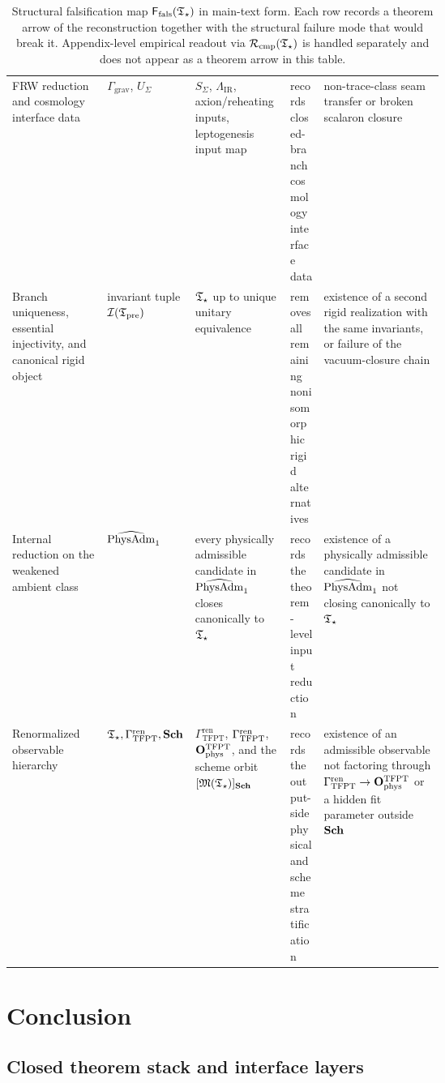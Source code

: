 \begin{table}[p]
\begin{tabularx}{\linewidth}{@{}>{\raggedright\arraybackslash}p{0.22\linewidth}>{\raggedright\arraybackslash}p{0.18\linewidth}>{\raggedright\arraybackslash}p{0.22\linewidth}YY@{}}
FRW reduction and cosmology interface data & $\Gamma_{\mathrm{grav}}$, $U_\Sigma$ & $S_\Sigma$, $\Lambda_{\mathrm{IR}}$, axion/reheating inputs, leptogenesis input map & records closed-branch cosmology interface data & non-trace-class seam transfer or broken scalaron closure \\
Branch uniqueness, essential injectivity, and canonical rigid object & invariant tuple $\mathcal I(\mathfrak T_{\mathrm{pre}})$ & $\mathfrak T_{\star}$ up to unique unitary equivalence & removes all remaining nonisomorphic rigid alternatives & existence of a second rigid realization with the same invariants, or failure of the vacuum-closure chain \\
Internal reduction on the weakened ambient class & $\widehat{\mathrm{PhysAdm}}_1$ & every physically admissible candidate in $\widehat{\mathrm{PhysAdm}}_1$ closes canonically to $\mathfrak T_{\star}$ & records the theorem-level input reduction & existence of a physically admissible candidate in $\widehat{\mathrm{PhysAdm}}_1$ not closing canonically to $\mathfrak T_{\star}$ \\
Renormalized observable hierarchy & $\mathfrak T_{\star},\Gamma_{\mathrm{TFPT}}^{\mathrm{ren}},\mathbf{Sch}$ & $\Gamma_{\mathrm{TFPT}}^{\mathrm{ren}}$, $\Gamma_{\mathrm{TFPT}}^{\mathrm{ren}}$, $\mathbf O_{\mathrm{phys}}^{\mathrm{TFPT}}$, and the scheme orbit $[\mathfrak M(\mathfrak T_{\star})]_{\mathbf{Sch}}$ & records the output-side physical and scheme stratification & existence of an admissible observable not factoring through $\Gamma_{\mathrm{TFPT}}^{\mathrm{ren}}\to\mathbf O_{\mathrm{phys}}^{\mathrm{TFPT}}$ or a hidden fit parameter outside $\mathbf{Sch}$ \\
\bottomrule
\end{tabularx}
\caption{Structural falsification map $\Ffals(\Tstar)$ in main-text form. Each row records a
theorem arrow of the reconstruction together with the structural failure mode that would break
it. Appendix-level empirical readout via $\Rcmp(\Tstar)$ is handled separately and does not
appear as a theorem arrow in this table.}
\label{tab:proof-obligations}
\end{table}


\section{Conclusion}

\subsection{Closed theorem stack and interface layers}

